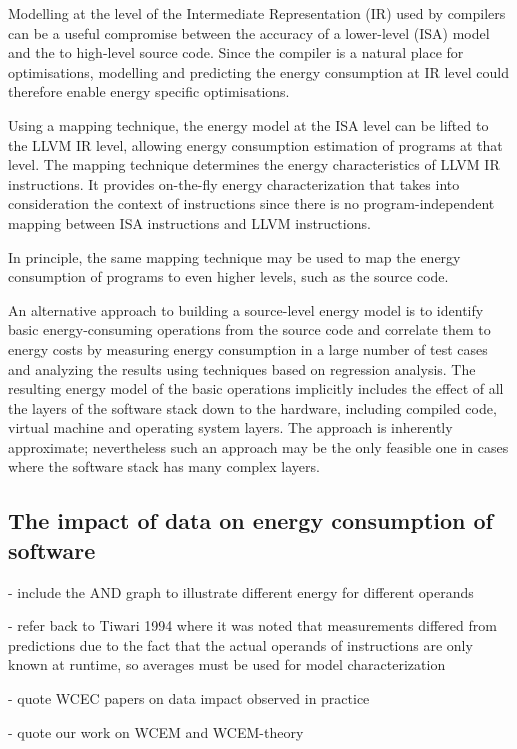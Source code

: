 Modelling at the level of the Intermediate Representation (IR) 
used by compilers can be a useful compromise between the accuracy of a lower-level (ISA) 
model and the to high-level source code. Since the compiler is a natural
place for optimisations, modelling and predicting the energy consumption at
IR level could therefore enable energy specific optimisations.

Using a mapping technique, 
the energy model at the ISA level can be lifted to the LLVM IR level, allowing energy
consumption estimation of programs at that level. 
The mapping technique determines the energy characteristics of LLVM IR
instructions. It provides on-the-fly energy characterization that takes into
consideration the context of instructions since there is no program-independent mapping between
ISA instructions and LLVM instructions.

In principle, the same mapping technique may be used to map the energy consumption
of programs to even higher levels, such as the source code. 


An alternative approach to building a source-level energy model is to identify
basic energy-consuming operations from the source code and
correlate them to energy costs by measuring energy consumption in
a large number of test cases and analyzing the results using techniques
based on regression analysis. The resulting energy model of the basic
operations implicitly includes the effect of all the layers of the software
stack down to the hardware, including compiled code, virtual machine and operating
system layers. The approach is inherently approximate;
nevertheless such an approach may be the only feasible one in cases where the software
stack has many complex layers. 


\subsection{The impact of data on energy consumption of software}

- include the AND graph to illustrate different energy for different operands

- refer back to Tiwari 1994 where it was noted that measurements differed from predictions due to the fact that the actual operands of instructions are only known at runtime, so averages must be used for model characterization

- quote WCEC papers on data impact observed in practice

- quote our work on WCEM and WCEM-theory

